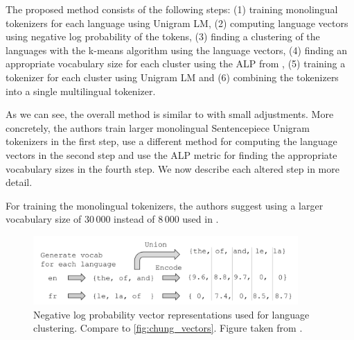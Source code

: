 
The proposed method consists of the following steps: (1) training monolingual tokenizers for each language using Unigram LM, (2) computing language vectors using negative log probability of the tokens, (3) finding a clustering of the languages with the k-means algorithm using the language vectors, (4) finding an appropriate vocabulary size for each cluster using the ALP from \citet{zheng_allocating_2021}, (5) training a tokenizer for each cluster using Unigram LM and (6) combining the tokenizers into a single multilingual tokenizer.

As we can see, the overall method is similar to \citet{chung_improving_2020} with small adjustments. More concretely, the authors train larger monolingual Sentencepiece Unigram tokenizers in the first step, use a different method for computing the language vectors in the second step and use the ALP metric for finding the appropriate vocabulary sizes in the fourth step. We now describe each altered step in more detail.

For training the monolingual tokenizers, the authors suggest using a larger vocabulary size of 30\,000 instead of 8\,000 used in \citet{chung_improving_2020}.

\begin{figure}[ht]
    \centering
    \includegraphics[width=0.9\textwidth]{img/temp/liang_language_vectors.png}
    \caption{Negative log probability vector representations used for language clustering. Compare to \autoref{fig:chung_vectors}. Figure taken from \cite{liang_xlm-v_2023}.}
    \label{fig:liang_vectors}
\end{figure}

